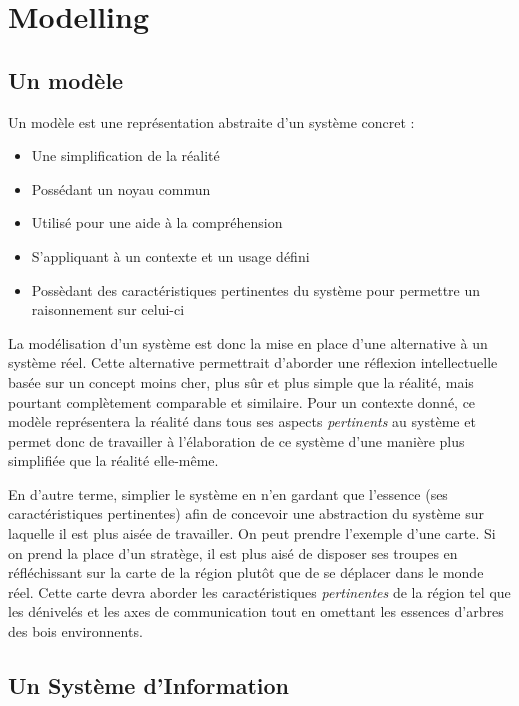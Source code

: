 \chapter{Modelling}

\section{Un modèle}

Un modèle est une représentation abstraite d'un système concret :

\begin{itemize}
  \item Une simplification de la réalité
  \item Possédant un noyau commun
  \item Utilisé pour une aide à la compréhension
  \item S'appliquant à un contexte et un usage défini
  \item Possèdant des caractéristiques pertinentes du système pour permettre un raisonnement sur celui-ci
\end{itemize}

La modélisation d'un système est donc la mise en place d'une alternative à un système réel. Cette alternative permettrait d'aborder une réflexion intellectuelle basée sur un concept moins cher, plus sûr et plus simple que la réalité, mais pourtant complètement comparable et similaire. Pour un contexte donné, ce modèle représentera la réalité dans tous ses aspects \textit{pertinents} au système et permet donc de travailler à l'élaboration de ce système d'une manière plus simplifiée que la réalité elle-même.

En d'autre terme, simplier le système en n'en gardant que l'essence (ses caractéristiques pertinentes) afin de concevoir une abstraction du système sur laquelle il est plus aisée de travailler. On peut prendre l'exemple d'une carte. Si on prend la place d'un stratège, il est plus aisé de disposer ses troupes en réfléchissant sur la carte de la région plutôt que de se déplacer dans le monde réel. Cette carte devra aborder les caractéristiques \textit{pertinentes} de la région tel que les dénivelés et les axes de communication tout en omettant les essences d'arbres des bois environnents.

\section{Un Système d'Information}

